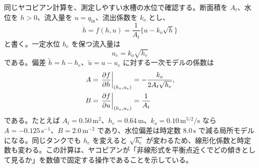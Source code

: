 同じヤコビアン計算を、測定しやすい水槽の水位で確認する。断面積を $A_t$、水位を $h>0$、流入量を $u=q_{\mathrm{in}}$、流出係数を $k_o$ とし、
\begin{equation}
  \dot{h}=f(h,u)=\frac{1}{A_t}\{u-k_o\sqrt{h}\}
\end{equation}
と書く。一定水位 $h_e$ を保つ流入量は
\begin{equation}
  u_e=k_o\sqrt{h_e}
\end{equation}
である。偏差 $\tilde{h}=h-h_e$、$\tilde{u}=u-u_e$ に対する一次モデルの係数は
\begin{align}
  A&=\left.\frac{\partial f}{\partial h}\right|_{(h_e,u_e)}
    =-\frac{k_o}{2A_t\sqrt{h_e}},\\
  B&=\left.\frac{\partial f}{\partial u}\right|_{(h_e,u_e)}
    =\frac{1}{A_t}
\end{align}
である。たとえば $A_t=0.50\,\mathrm{m^2}$、$h_e=0.64\,\mathrm{m}$、$k_o=0.10\,\mathrm{m^{5/2}/s}$ なら $A=-0.125\,\mathrm{s^{-1}}$、$B=2.0\,\mathrm{m^{-2}}$ であり、水位偏差は時定数 $8.0\,\mathrm{s}$ で減る局所モデルになる。同じタンクでも $h_e$ を変えると $\sqrt{h_e}$ が変わるため、線形化係数と時定数も変わる。この計算は、ヤコビアンが「非線形式を平衡点近くでどの傾きとして見るか」を数値で固定する操作であることを示している。
